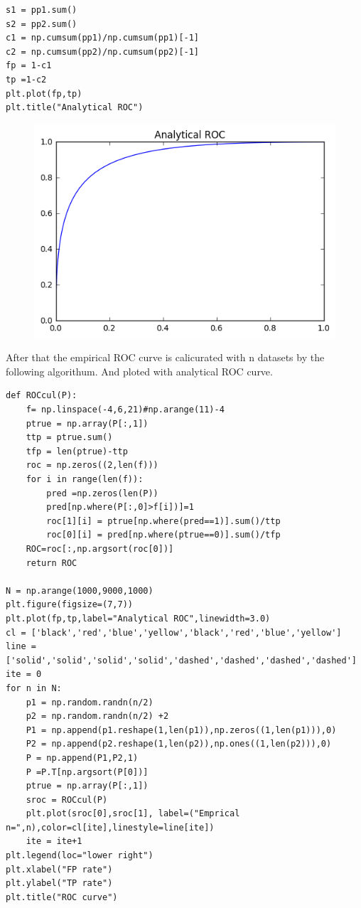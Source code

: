 \documentclass[a4paper,11pt]{article}
\begin{document}
\begin{verbatim}
s1 = pp1.sum()
s2 = pp2.sum()
c1 = np.cumsum(pp1)/np.cumsum(pp1)[-1]
c2 = np.cumsum(pp2)/np.cumsum(pp2)[-1]
fp = 1-c1
tp =1-c2
plt.plot(fp,tp)
plt.title("Analytical ROC")
\end{verbatim}

\begin{figure}[htbp]
  \includegraphics[scale=0.7]{roc.png}
\end{figure}

After that the empirical ROC curve is calicurated with n datasets by the following algorithum. And ploted with analytical ROC curve.

\begin{verbatim}
def ROCcul(P):
    f= np.linspace(-4,6,21)#np.arange(11)-4
    ptrue = np.array(P[:,1])
    ttp = ptrue.sum()
    tfp = len(ptrue)-ttp
    roc = np.zeros((2,len(f)))
    for i in range(len(f)):
        pred =np.zeros(len(P))
        pred[np.where(P[:,0]>f[i])]=1
        roc[1][i] = ptrue[np.where(pred==1)].sum()/ttp
        roc[0][i] = pred[np.where(ptrue==0)].sum()/tfp
    ROC=roc[:,np.argsort(roc[0])]
    return ROC

N = np.arange(1000,9000,1000)
plt.figure(figsize=(7,7))
plt.plot(fp,tp,label="Analytical ROC",linewidth=3.0)
cl = ['black','red','blue','yellow','black','red','blue','yellow']
line = ['solid','solid','solid','solid','dashed','dashed','dashed','dashed']
ite = 0
for n in N:
    p1 = np.random.randn(n/2)
    p2 = np.random.randn(n/2) +2
    P1 = np.append(p1.reshape(1,len(p1)),np.zeros((1,len(p1))),0)
    P2 = np.append(p2.reshape(1,len(p2)),np.ones((1,len(p2))),0)
    P = np.append(P1,P2,1)
    P =P.T[np.argsort(P[0])]
    ptrue = np.array(P[:,1])
    sroc = ROCcul(P)
    plt.plot(sroc[0],sroc[1], label=("Emprical n=",n),color=cl[ite],linestyle=line[ite])
    ite = ite+1
plt.legend(loc="lower right")
plt.xlabel("FP rate")
plt.ylabel("TP rate")
plt.title("ROC curve")
\end{verbatim}
\end{document}
